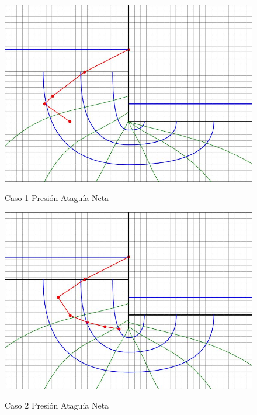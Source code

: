 \begin{figure}[H]
    \centering
    \begin{minipage}{0.32\textwidth}
        \centering
        \includegraphics[width=\textwidth]{GRAFICOS/caso_1_presion_ataguia_neta.jpg}
        \caption{Caso 1 Presión Ataguía Neta}
        \label{fig:caso_1_presion_ataguia_neta}
    \end{minipage}
    \begin{minipage}{0.32\textwidth}
        \centering
        \includegraphics[width=\textwidth]{GRAFICOS/caso_2_presion_ataguia_neta.jpg}
        \caption{Caso 2 Presión Ataguía Neta}
        \label{fig:caso_2_presion_ataguia_neta}
    \end{minipage}

\end{figure}
